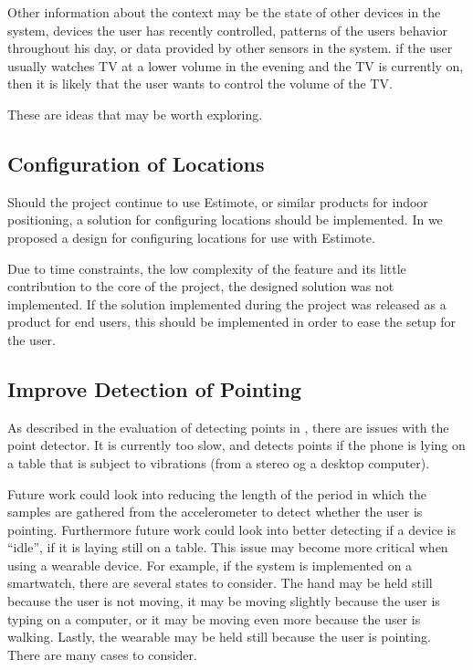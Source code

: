 Other information about the context may be the state of other devices in the system, 
devices the user has recently controlled, 
patterns of the users behavior throughout his day, 
or data provided by other sensors in the system.
\eg if the user usually watches TV at a lower volume in the evening and the TV is currently on, then it is likely that the user wants to control the volume of the TV.

These are ideas that may be worth exploring. 

\subsection{Configuration of Locations}

Should the project continue to use Estimote, 
or similar products for indoor positioning, 
a solution for configuring locations should be implemented. 
In  we proposed a design for configuring locations for use with Estimote. 

Due to time constraints, 
the low complexity of the feature and its little contribution to the core of the project, 
the designed solution was not implemented. 
If the solution implemented during the project was released as a product for end users, 
this should be implemented in order to ease the setup for the user.

\subsection{Improve Detection of Pointing}

As described in the evaluation of detecting points in , 
there are issues with the point detector. 
It is currently too slow, 
and detects points if the phone is lying on a table that is subject to vibrations (from \eg a stereo og a desktop computer).

Future work could look into reducing the length of the period in which the samples are gathered from the accelerometer to detect whether the user is pointing.
Furthermore future work could look into better detecting if a device is ``idle'', 
\ie if it is laying still on \eg a table. 
This issue may become more critical when using a wearable device. 
For example, if the system is implemented on a smartwatch, 
there are several states to consider. 
The hand may be held still because the user is not moving, 
it may be moving slightly because the user is typing on a computer, 
or it may be moving even more because the user is walking. 
Lastly, the wearable may be held still because the user is pointing. 
There are many cases to consider.

